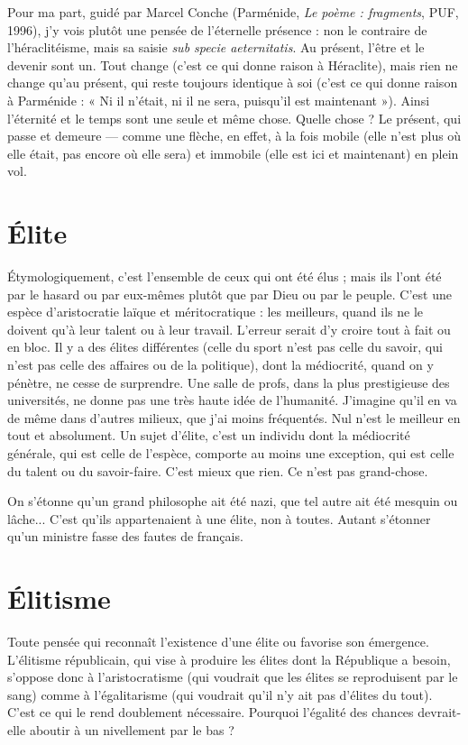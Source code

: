 Pour ma part, guidé par Marcel Conche (Parménide, {\it Le poème : fragments},
PUF, 1996), j'y vois plutôt une pensée de l’éternelle présence : non le contraire
de l’héraclitéisme, mais sa saisie {\it sub specie aeternitatis}. Au présent, l'être et le
devenir sont un. Tout change (c’est ce qui donne raison à Héraclite), mais rien
ne change qu’au présent, qui reste toujours identique à soi (c’est ce qui donne
raison à Parménide : « Ni il n’était, ni il ne sera, puisqu'il est maintenant »).
Ainsi l'éternité et le temps sont une seule et même chose. Quelle chose ? Le
présent, qui passe et demeure — comme une flèche, en effet, à la fois mobile
(elle n’est plus où elle était, pas encore où elle sera) et immobile (elle est ici et
maintenant) en plein vol.

\section{Élite}
Étymologiquement, c’est l’ensemble de ceux qui ont été élus ; mais
ils l'ont été par le hasard ou par eux-mêmes plutôt que par Dieu ou
par le peuple. C’est une espèce d’aristocratie laïque et méritocratique : les
meilleurs, quand ils ne le doivent qu’à leur talent ou à leur travail. L'erreur
serait d'y croire tout à fait ou en bloc. Il y a des élites différentes (celle du sport
n’est pas celle du savoir, qui n’est pas celle des affaires ou de la politique), dont
la médiocrité, quand on y pénètre, ne cesse de surprendre. Une salle de profs,
dans la plus prestigieuse des universités, ne donne pas une très haute idée de
l'humanité. J'imagine qu’il en va de même dans d’autres milieux, que j'ai
moins fréquentés. Nul n’est le meilleur en tout et absolument. Un sujet d'élite,
c'est un individu dont la médiocrité générale, qui est celle de l’espèce, comporte
au moins une exception, qui est celle du talent ou du savoir-faire. C'est
mieux que rien. Ce n’est pas grand-chose.

On s'étonne qu’un grand philosophe ait été nazi, que tel autre ait été mesquin
ou lâche... C’est qu’ils appartenaient à une élite, non à toutes. Autant
s'étonner qu’un ministre fasse des fautes de français.

\section{Élitisme}
Toute pensée qui reconnaît l’existence d’une élite ou favorise son
émergence. L’élitisme républicain, qui vise à produire les élites
dont la République a besoin, s’oppose donc à l’aristocratisme (qui voudrait que
les élites se reproduisent par le sang) comme à l’égalitarisme (qui voudrait qu’il
n'y ait pas d’élites du tout). C’est ce qui le rend doublement nécessaire. Pourquoi
l'égalité des chances devrait-elle aboutir à un nivellement par le bas ?

